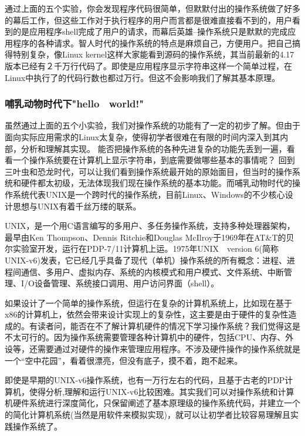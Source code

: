 通过上面的五个实验，你会发现程序代码很简单，但默默付出的操作系统做了好多的幕后工作，但这些工作对于执行程序的用户而言都是很难直接看不到的，用户看到的是应用程序shell完成了用户的请求，而幕后英雄--操作系统只是默默的完成应用程序的各种请求。智人时代的操作系统的特点是麻烦自己，方便用户。把自己搞得特别复杂，像Linux kernel这样大家能看到源码的操作系统，其当前最新的4.17版本已经有２千万行代码了。即使是应用程序显示字符串这样一个简单过程，在Linux中执行了的代码行数也都过万行。但这不会影响我们了解其基本原理。

\subsubsection{哺乳动物时代下"hello　world!"}

虽然通过上面的五个小实验，我们对操作系统的功能有了一定的初步了解。但由于面向实际应用需求的Linux太复杂，使得初学者很难在有限的时间内深入到其内部，分析和理解其实现。
能否把操作系统的各种先进复杂的功能先丢到一遍，看看一个操作系统要在计算机上显示字符串，到底需要做哪些基本的事情呢？
回到三叶虫和恐龙时代，可以让我们看到操作系统最开始的原始面目，但当时的操作系统和硬件都太初级，无法体现我们现在操作系统的基本功能。而哺乳动物时代的操作系统代表UNIX是一个跨时代的操作系统，目前Linux、Windows的不少核心设计思想与UNIX有着千丝万缕的联系。

\begin{note} 
UNIX，是一个用C语言编写的多用户、多任务操作系统，支持多种处理器架构，最早由Ken Thompson、Dennis Ritchie和Douglas McIlroy于1969年在AT\&T的贝尔实验室开发，运行在PDP-7/11计算机上运。1975年UNIX　version 6(简称UNIX-v6)发表，它已经几乎具备了现代（单机）操作系统的所有概念：进程、进程间通信、多用户、虚拟内存、系统的内核模式和用户模式、文件系统、中断管理、I/O设备管理、系统接口调用、用户访问界面（shell）。
\end{note} 
	
如果设计了一个简单的操作系统，但运行在复杂的计算机系统上，比如现在基于x86的计算机上，依然会带来设计实现上的复杂性，这主要是由于硬件的复杂性造成的。有读者问，能否在不了解计算机硬件的情况下学习操作系统？我们觉得这是不太可行的。因为操作系统需要管理各种计算机中的硬件，包括CPU、内存、外设等，还需要通过对硬件的操作来管理应用程序。不涉及硬件操作的操作系统就是一个“空中花园”，看着很漂亮，但没有底子，摸不着，跑不起来。

即使是早期的UNIX-v6操作系统，也有一万行左右的代码，且基于古老的PDP计算机，使得分析,理解和运行UNIX-v6比较困难。其实我们可以对操作系统和计算机硬件系统进行深度简化，只保留阐述了基本原理级的操作系统代码，并建立一个的简化计算机系统(当然是用软件来模拟实现)，就可以让初学者比较容易理解且实践操作系统了。


